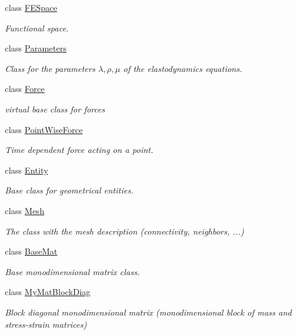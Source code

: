 \begin{DoxyCompactItemize}
\item 
class \hyperlink{classTspeed_1_1FESpace}{F\-E\-Space}
\begin{DoxyCompactList}\small\item\em Functional space. \end{DoxyCompactList}\item 
class \hyperlink{classTspeed_1_1Parameters}{Parameters}
\begin{DoxyCompactList}\small\item\em Class for the parameters $\lambda, \rho, \mu$ of the elastodynamics equations. \end{DoxyCompactList}\item 
class \hyperlink{classTspeed_1_1Force}{Force}
\begin{DoxyCompactList}\small\item\em virtual base class for forces \end{DoxyCompactList}\item 
class \hyperlink{classTspeed_1_1PointWiseForce}{Point\-Wise\-Force}
\begin{DoxyCompactList}\small\item\em Time dependent force acting on a point. \end{DoxyCompactList}\item 
class \hyperlink{classTspeed_1_1Entity}{Entity}
\begin{DoxyCompactList}\small\item\em Base class for geometrical entities. \end{DoxyCompactList}\item 
class \hyperlink{classTspeed_1_1Mesh}{Mesh}
\begin{DoxyCompactList}\small\item\em The class with the mesh description (connectivity, neighbors, ...) \end{DoxyCompactList}\item 
class \hyperlink{classTspeed_1_1BaseMat}{Base\-Mat}
\begin{DoxyCompactList}\small\item\em Base monodimensional matrix class. \end{DoxyCompactList}\item 
class \hyperlink{classTspeed_1_1MyMatBlockDiag}{My\-Mat\-Block\-Diag}
\begin{DoxyCompactList}\small\item\em Block diagonal monodimensional matrix (monodimensional block of mass and stress-\/strain matrices) \end{DoxyCompactList}\item 

\end{DoxyCompactItemize}
